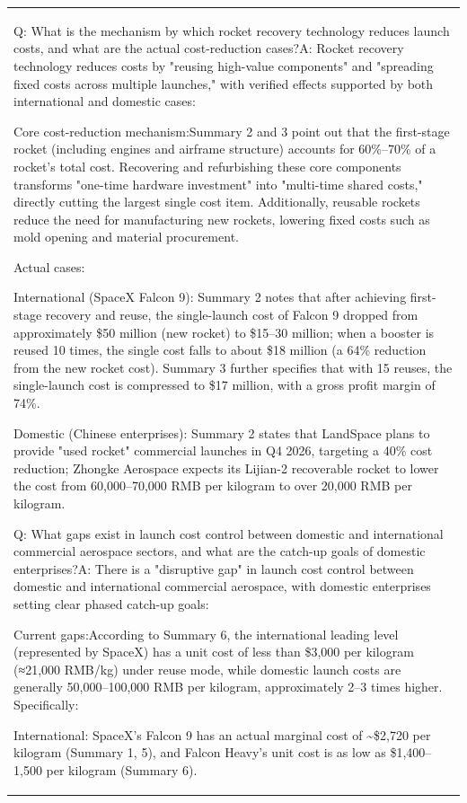 \begin{longtable}[]{@{}
  >{\raggedright\arraybackslash}p{}@{}}
Q: What is the mechanism by which rocket recovery technology reduces
launch costs, and what are the actual cost-reduction cases?A: Rocket
recovery technology reduces costs by "reusing high-value components" and
"spreading fixed costs across multiple launches," with verified effects
supported by both international and domestic cases:

Core cost-reduction mechanism:Summary 2 and 3 point out that the
first-stage rocket (including engines and airframe structure) accounts
for 60\%--70\% of a rocket's total cost. Recovering and refurbishing
these core components transforms "one-time hardware investment" into
"multi-time shared costs," directly cutting the largest single cost
item. Additionally, reusable rockets reduce the need for manufacturing
new rockets, lowering fixed costs such as mold opening and material
procurement.

Actual cases:

International (SpaceX Falcon 9): Summary 2 notes that after achieving
first-stage recovery and reuse, the single-launch cost of Falcon 9
dropped from approximately \$50 million (new rocket) to \$15--30
million; when a booster is reused 10 times, the single cost falls to
about \$18 million (a 64\% reduction from the new rocket cost). Summary
3 further specifies that with 15 reuses, the single-launch cost is
compressed to \$17 million, with a gross profit margin of 74\%.

Domestic (Chinese enterprises): Summary 2 states that LandSpace plans to
provide "used rocket" commercial launches in Q4 2026, targeting a 40\%
cost reduction; Zhongke Aerospace expects its Lijian-2 recoverable
rocket to lower the cost from 60,000--70,000 RMB per kilogram to over
20,000 RMB per kilogram.

Q: What gaps exist in launch cost control between domestic and
international commercial aerospace sectors, and what are the catch-up
goals of domestic enterprises?A: There is a "disruptive gap" in launch
cost control between domestic and international commercial aerospace,
with domestic enterprises setting clear phased catch-up goals:

Current gaps:According to Summary 6, the international leading level
(represented by SpaceX) has a unit cost of less than \$3,000 per
kilogram (≈21,000 RMB/kg) under reuse mode, while domestic launch costs
are generally 50,000--100,000 RMB per kilogram, approximately 2--3 times
higher. Specifically:

International: SpaceX's Falcon 9 has an actual marginal cost of
\textasciitilde\$2,720 per kilogram (Summary 1, 5), and Falcon Heavy's
unit cost is as low as \$1,400--1,500 per kilogram (Summary 6).


\end{longtable}
